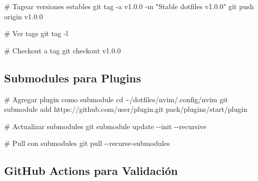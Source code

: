 \documentclass[
  doc,
  floatsintext,
  longtable,
  a4paper,
  nolmodern,
  notxfonts,
  notimes,
  12pt,
  colorlinks=true,linkcolor=blue,citecolor=blue,urlcolor=blue]{apa7}
\newenvironment{Shaded}{\begin{snugshade}}{\end{snugshade}}
\newcommand{\AttributeTok}[1]{\textcolor[rgb]{0.40,0.45,0.13}{#1}}
\newcommand{\BuiltInTok}[1]{\textcolor[rgb]{0.00,0.23,0.31}{#1}}
\newcommand{\CommentTok}[1]{\textcolor[rgb]{0.37,0.37,0.37}{#1}}
\newcommand{\FunctionTok}[1]{\textcolor[rgb]{0.28,0.35,0.67}{#1}}
\newcommand{\NormalTok}[1]{\textcolor[rgb]{0.00,0.23,0.31}{#1}}
\newcommand{\StringTok}[1]{\textcolor[rgb]{0.13,0.47,0.30}{#1}}
\begin{document}
\begin{Shaded}
\begin{Highlighting}[]
\CommentTok{\# Tagear versiones estables}
\FunctionTok{git}\NormalTok{ tag }\AttributeTok{{-}a}\NormalTok{ v1.0.0 }\AttributeTok{{-}m} \StringTok{"Stable dotfiles v1.0.0"}
\FunctionTok{git}\NormalTok{ push origin v1.0.0}

\CommentTok{\# Ver tags}
\FunctionTok{git}\NormalTok{ tag }\AttributeTok{{-}l}

\CommentTok{\# Checkout a tag}
\FunctionTok{git}\NormalTok{ checkout v1.0.0}
\end{Highlighting}
\end{Shaded}

\subsection{Submodules para Plugins}\label{submodules-para-plugins}

\begin{Shaded}
\begin{Highlighting}[]
\CommentTok{\# Agregar plugin como submodule}
\BuiltInTok{cd}\NormalTok{ \textasciitilde{}/dotfiles/nvim/.config/nvim}
\FunctionTok{git}\NormalTok{ submodule add https://github.com/user/plugin.git pack/plugins/start/plugin}

\CommentTok{\# Actualizar submodules}
\FunctionTok{git}\NormalTok{ submodule update }\AttributeTok{{-}{-}init} \AttributeTok{{-}{-}recursive}

\CommentTok{\# Pull con submodules}
\FunctionTok{git}\NormalTok{ pull }\AttributeTok{{-}{-}recurse{-}submodules}
\end{Highlighting}
\end{Shaded}

\subsection{GitHub Actions para
Validación}\label{github-actions-para-validaciuxf3n}
\end{document}
